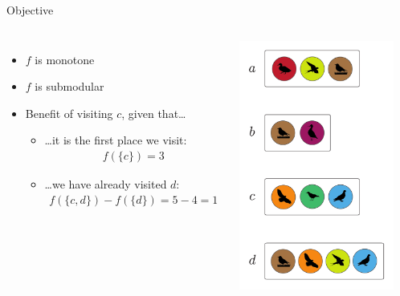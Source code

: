 \documentclass[xetex,10pt,mathserif]{beamer}
\begin{document}
\begin{frame}{Objective}
\begin{columns}[c]
\begin{itemize}
\item $f$ is monotone
\vspace{2em}
\item $f$ is submodular
\vspace{2em}
\item Benefit of visiting $c$, given that\ldots
\begin{itemize}
\vspace{1em}
\item \ldots it is the first place we visit:
\begin{align*}
  f(\{c\}) = 3
\end{align*}
\item \ldots we have already visited $d$:
\begin{align*}
  f(\{c, d\}) - f(\{d\}) = 5 - 4 = 1
\end{align*}
\end{itemize}
\end{itemize}
\centering
\includegraphics[width=2in]{figures/sets.pdf}
\end{columns}
\end{frame}
\end{document}
